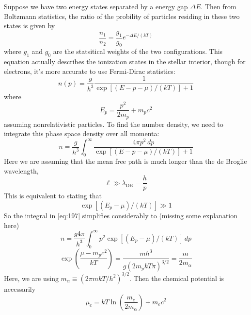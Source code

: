 \documentclass[10pt]{article}
\numberwithin{equation}{section}
\begin{document}
    Suppose we have two energy states separated by a energy gap
    $\Delta E$. Then from Boltzmann statistics, the ratio of the
    probility of particles residing in these two states is given by
    \begin{equation}
      \label{eq:194}
      \frac{n_1}{n_2}=\frac{g_1}{g_0}e^{-\Delta E/(kT)}
    \end{equation}
    where $g_1$ and $g_0$ are the statsitical weights of the two
    configurations. This equation actually describes the ionization
    states in the stellar interior, though for electrons, it's more
    accurate to use Fermi-Dirac statistics:
    \begin{equation}
      \label{eq:195}
      \boxed{n(p)=\frac{g}{h^3}\frac{1}{\exp\left[(E-p-\mu)/(kT)\right]+1}}
    \end{equation}
    where
    \begin{equation}
      \label{eq:196}
      \boxed{E_p=\frac{p^2}{2m_p}+m_pc^2}
    \end{equation}
    assuming nonrelativistic particles. To find the number density, we
    need to integrate this phase space density over all momenta:
    \begin{equation}
      \label{eq:197}
      n=\frac{g}{h^3}\int_0^\infty\frac{4\pi p^2\,dp}{\exp\left[(E-p-\mu)/(kT)\right]+1}
    \end{equation}
    Here we are assuming that the mean free path is much longer than
    the de Broglie wavelength,
    \begin{equation}
      \label{eq:198}
      \ell\gg \lambda_{\mathrm{DB}}=\frac{h}{p}
    \end{equation}
    This is equivalent to stating that
    \begin{equation}
      \label{eq:199}
      \exp\left[(E_p-\mu)/(kT)\right]\gg 1
    \end{equation}
    So the integral in \eqref{eq:197} simplifies considerably to
    (missing some explanation here)
    \begin{equation}
      \label{eq:200}
      n=\frac{g 4\pi}{h^3}\int_0^\infty p^2 \exp\left[(E_p-\mu)/(kT)\right]\,dp
    \end{equation}
    \begin{equation}
      \label{eq:201}
      \exp\left(\frac{\mu-m_pc^2}{kT}\right)=\frac{mh^3}{g(2m_pk T\pi)^{3/2}}=\frac{m}{2m_\alpha}
    \end{equation}
    Here, we are using $m_\alpha\equiv (2\pi mkT/h^2)^{3/2}$. Then the
    chemical potential is necessarily
    \begin{equation}
      \label{eq:202}
      \boxed{\mu_e=kT\ln\left(\frac{m_e}{2m_\alpha}\right)+m_ec^2}
    \end{equation}
\end{document}
